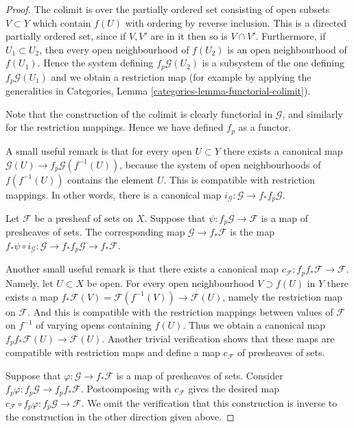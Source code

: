 \begin{proof}
The colimit is over the partially ordered set consisting of open subsets
$V \subset Y$ which contain $f(U)$ with ordering by reverse inclusion.
This is a directed partially ordered set, since if $V, V'$ are in it then
so is $V \cap V'$. Furthermore, if
$U_1 \subset U_2$, then every open neighbourhood of $f(U_2)$
is an open neighbourhood of $f(U_1)$. Hence the system defining
$f_p\mathcal{G}(U_2)$ is a subsystem of the one defining
$f_p\mathcal{G}(U_1)$ and we obtain a restriction map (for
example by applying the generalities in Categories,
Lemma \ref{categories-lemma-functorial-colimit}).

\medskip\noindent
Note that the construction of the colimit is clearly functorial
in $\mathcal{G}$, and similarly for the restriction mappings.
Hence we have defined $f_p$ as a functor.

\medskip\noindent
A small useful remark is that for every open $U \subset Y$ there exists
a canonical map $\mathcal{G}(U) \to f_p\mathcal{G}(f^{-1}(U))$,
because the system of open neighbourhoods
of $f(f^{-1}(U))$ contains the element $U$. This is compatible
with restriction mappings. In other words, there is a
canonical map $i_\mathcal{G} : \mathcal{G} \to f_* f_p \mathcal{G}$.

\medskip\noindent
Let $\mathcal{F}$ be a presheaf of sets on $X$.
Suppose that $\psi : f_p\mathcal{G} \to \mathcal{F}$
is a map of presheaves of sets. The corresponding map
$\mathcal{G} \to f_*\mathcal{F}$ is the map
$f_*\psi \circ i_\mathcal{G} :
\mathcal{G} \to f_* f_p \mathcal{G} \to f_* \mathcal{F}$.

\medskip\noindent
Another small useful remark is that there exists a
canonical map $c_\mathcal{F} : f_p f_* \mathcal{F} \to \mathcal{F}$.
Namely, let $U \subset X$ be open.
For every open neighbourhood $V \supset f(U)$ in $Y$
there exists a map
$f_*\mathcal{F}(V) = \mathcal{F}(f^{-1}(V))\to \mathcal{F}(U)$,
namely the restriction map on $\mathcal{F}$. And this is compatible
with the restriction mappings between values of $\mathcal{F}$
on $f^{-1}$ of varying opens containing $f(U)$. Thus we obtain
a canonical map $f_p f_* \mathcal{F}(U) \to \mathcal{F}(U)$.
Another trivial verification shows that these maps are compatible
with restriction maps and define a map $c_\mathcal{F}$
of presheaves of sets.

\medskip\noindent
Suppose that $\varphi : \mathcal{G} \to f_*\mathcal{F}$
is a map of presheaves of sets. Consider $f_p\varphi :
f_p \mathcal{G} \to f_p f_* \mathcal{F}$.
Postcomposing with $c_\mathcal{F}$ gives the desired map
$c_\mathcal{F} \circ f_p\varphi : f_p\mathcal{G} \to \mathcal{F}$.
We omit the verification that this construction is inverse
to the construction in the other direction given above.
\end{proof}

